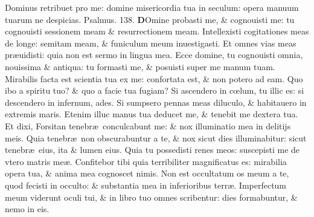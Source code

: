 \documentclass[a5paper,10pt]{book}
\def\ae{æ}
\def\oe{œ}
\begin{document}
\begin{multicols*}{2}
\newline \color{red} D\color{black}ominus retribuet pro me: domine misericordia tua in seculum: opera manuum tuarum ne despicias.
\newline \color{red} Psalmus. \hypertarget{ps138}{138.} \color{black}
\lettrine[lines=2]{\bfseries \color{red} D}{}Omine probasti me, \& cognouisti me: tu cognouisti sessionem meam \& resurrectionem meam.
\newline \color{red} I\color{black}ntellexisti cogitationes meas de longe: semitam meam, \& funiculum meum inuestigasti.
\newline \color{red} E\color{black}t omnes vias meas pr\ae uidisti: quia non est sermo in lingua mea.
\newline \color{red} E\color{black}cce domine, tu cognouisti omnia, nouissima \& antiqua: tu formasti me, \& posuisti super me manum tuam.
\newline \color{red} M\color{black}irabilis facta est scientia tua ex me: confortata est, \& non potero ad eam.
\newline \color{red} Q\color{black}uo ibo a spiritu tuo? \& quo a facie tua fugiam?
\newline \color{red} S\color{black}i ascendero in c\oe lum, tu illic es: si descendero in infernum, ades.
\newline \color{red} S\color{black}i sumpsero pennas meas diluculo, \& habitauero in extremis maris.
\newline \color{red} E\color{black}tenim illuc manus tua deducet me, \& tenebit me dextera tua.
\newline \color{red} E\color{black}t dixi, Forsitan tenebr\ae \ conculcabunt me: \& nox illuminatio mea in delitijs meis.%
\newline \color{red} Q\color{black}uia tenebr\ae \ non obscurabuntur a te, \& nox sicut dies illuminabitur: sicut tenebr\ae \ eius, ita \& lumen eius.
\newline \color{red} Q\color{black}uia tu possedisti renes meos: suscepisti me de vtero matris me\ae .
\newline \color{red} C\color{black}onfitebor tibi quia terribiliter magnificatus es: mirabilia opera tua, \& anima mea cognoscet nimis.%
\newline \color{red} N\color{black}on est occultatum os meum a te, quod fecisti in occulto: \& substantia mea in inferioribus terr\ae .
\newline \color{red} I\color{black}mperfectum meum viderunt oculi tui, \& in libro tuo omnes scribentur: dies formabuntur, \& nemo in eis.

\end{multicols*}
\end{document}
